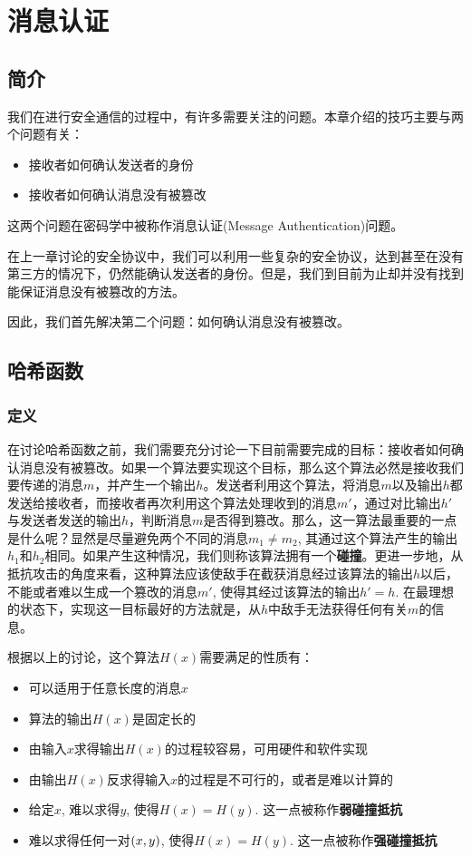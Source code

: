 \chapter{消息认证}
\section{简介}
我们在进行安全通信的过程中，有许多需要关注的问题。本章介绍的技巧主要与两个问题有关：
\begin{itemize}
	\item 接收者如何确认发送者的身份
	\item 接收者如何确认消息没有被篡改
\end{itemize}

这两个问题在密码学中被称作消息认证(Message Authentication)问题。\par
在上一章讨论的安全协议中，我们可以利用一些复杂的安全协议，达到甚至在没有第三方的情况下，仍然能确认发送者的身份。但是，我们到目前为止却并没有找到能保证消息没有被篡改的方法。\par
因此，我们首先解决第二个问题：如何确认消息没有被篡改。
\section{哈希函数}
\subsection{定义}
在讨论哈希函数之前，我们需要充分讨论一下目前需要完成的目标：接收者如何确认消息没有被篡改。如果一个算法要实现这个目标，那么这个算法必然是接收我们要传递的消息$m$，并产生一个输出$h$。发送者利用这个算法，将消息$m$以及输出$h$都发送给接收者，而接收者再次利用这个算法处理收到的消息$m'$，通过对比输出$h'$与发送者发送的输出$h$，判断消息$m$是否得到篡改。那么，这一算法最重要的一点是什么呢？显然是尽量避免两个不同的消息$m_1\neq m_2$, 其通过这个算法产生的输出$h_1$和$h_2$相同。如果产生这种情况，我们则称该算法拥有一个\textbf{碰撞}。更进一步地，从抵抗攻击的角度来看，这种算法应该使敌手在截获消息经过该算法的输出$h$以后，不能或者难以生成一个篡改的消息$m'$, 使得其经过该算法的输出$h'=h$. 在最理想的状态下，实现这一目标最好的方法就是，从$h$中敌手无法获得任何有关$m$的信息。\par
根据以上的讨论，这个算法$H(x)$需要满足的性质有：
\begin{itemize}
	\item 可以适用于任意长度的消息$x$
	\item 算法的输出$H(x)$是固定长的
	\item 由输入$x$求得输出$H(x)$的过程较容易，可用硬件和软件实现
	\item 由输出$H(x)$反求得输入$x$的过程是不可行的，或者是难以计算的
	\item 给定$x$, 难以求得$y$, 使得$H(x)=H(y)$. 这一点被称作\textbf{弱碰撞抵抗}
	\item 难以求得任何一对$\left( {x, y}\right)$, 使得$H(x)=H(y)$. 这一点被称作\textbf{强碰撞抵抗}
\end{itemize}

